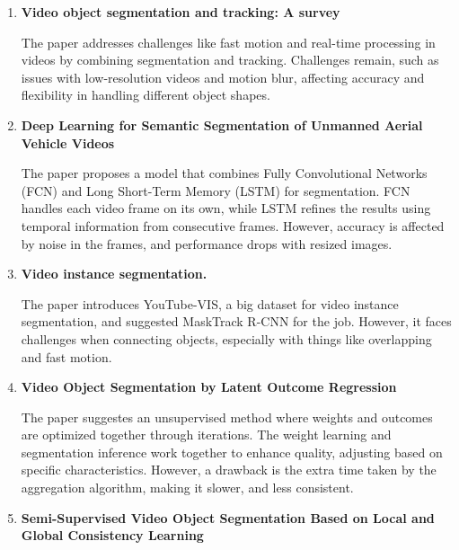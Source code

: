 \begin{enumerate}

\item \textbf{Video object segmentation and tracking: A survey}\cite{main_paper}

The paper addresses challenges like fast motion and real-time processing in videos by combining segmentation and tracking. Challenges remain, such as issues with low-resolution videos and motion blur, affecting accuracy and flexibility in handling different object shapes.\\


\item \textbf{Deep Learning for Semantic Segmentation of Unmanned Aerial Vehicle Videos}\cite{1}

The paper proposes a model that combines Fully Convolutional Networks (FCN) and Long Short-Term Memory (LSTM) for segmentation. FCN handles each video frame on its own, while LSTM refines the results using temporal information from consecutive frames. However, accuracy is affected by noise in the frames, and performance drops with resized images.


\item \textbf{Video instance segmentation.}\cite{2}

The paper introduces YouTube-VIS, a big dataset for video instance segmentation, and suggested MaskTrack R-CNN for the job. However, it faces challenges when connecting objects, especially with things like overlapping and fast motion.\\

\item \textbf{Video Object Segmentation by Latent Outcome Regression}\cite{9}

The paper suggestes an unsupervised method where weights and outcomes are optimized together through iterations. The weight learning and segmentation inference work together to enhance quality, adjusting based on specific characteristics. However, a drawback is the extra time taken by the aggregation algorithm, making it slower, and less consistent.\\


\item \textbf{Semi-Supervised Video Object Segmentation Based on Local and Global Consistency Learning}\cite{5}


\end{enumerate}
